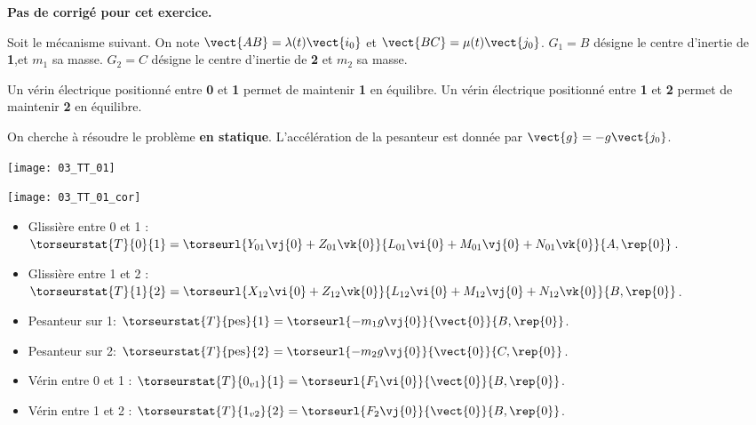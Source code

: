 \normaltrue
\correctiontrue



\setcounter{question}{0}
\ifcorrection
\else
\textbf{Pas de corrigé pour cet exercice.}
\fi

\ifprof
\else
Soit le mécanisme suivant. On note $\vect{AB}=\lambda(t)\vect{i_0}$ et $\vect{BC}=\mu(t)\vect{j_0}$.
$G_1 = B$ désigne le centre d'inertie de \textbf{1},et $m_1$ sa masse. %
$G_2 = C$ désigne le centre d'inertie de \textbf{2} et  $m_2$ sa masse. %

 Un vérin électrique positionné entre \textbf{0} et \textbf{1} permet de maintenir \textbf{1} en équilibre.
 Un vérin électrique positionné entre \textbf{1} et \textbf{2} permet de maintenir \textbf{2} en équilibre.
 
 On cherche à résoudre le problème \textbf{en statique}.
L'accélération de la pesanteur est donnée par $\vect{g}=-g\vect{j_0}$.



\begin{center}
\texttt{[image: 03\_TT\_01]}
\end{center}
\fi

\ifprof
\begin{center}
\texttt{[image: 03\_TT\_01\_cor]}
\end{center}

\else
\fi

\ifprof
\begin{itemize}
\item Glissière entre 0 et 1 : $\torseurstat{T}{0}{1}=\torseurl{Y_{01}\vj{0}+Z_{01}\vk{0}}{L_{01}\vi{0}+M_{01}\vj{0}+N_{01}\vk{0}}{A,\rep{0}}$.
\item Glissière entre 1 et 2 : $\torseurstat{T}{1}{2}=\torseurl{X_{12}\vi{0}+Z_{12}\vk{0}}{L_{12}\vi{0}+M_{12}\vj{0}+N_{12}\vk{0}}{B,\rep{0}}$.
\item Pesanteur sur 1: $\torseurstat{T}{\text{pes}}{1}=\torseurl{-m_1g\vj{0}}{\vect{0}}{B,\rep{0}}$.
\item Pesanteur sur 2: $\torseurstat{T}{\text{pes}}{2}=\torseurl{-m_2g\vj{0}}{\vect{0}}{C,\rep{0}}$.
\item Vérin entre 0 et 1 : $\torseurstat{T}{0_{v1}}{1}=\torseurl{F_1\vi{0}}{\vect{0}}{B,\rep{0}}$.
\item Vérin entre 1 et 2 : $\torseurstat{T}{1_{v2}}{2}=\torseurl{F_2\vj{0}}{\vect{0}}{B,\rep{0}}$.
\end{itemize}
\else
\fi


